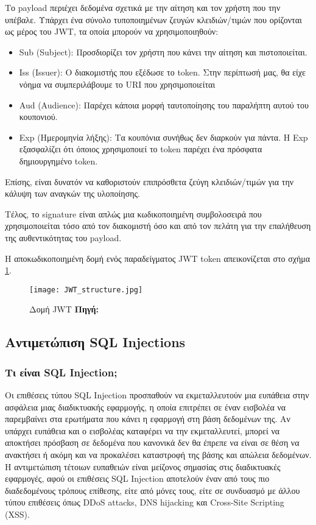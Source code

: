 Το payload περιέχει δεδομένα σχετικά με την αίτηση και τον χρήστη που την υπέβαλε. Υπάρχει ένα σύνολο τυποποιημένων ζευγών κλειδιών/τιμών που ορίζονται ως μέρος του JWT, τα οποία μπορούν να χρησιμοποιηθούν:
\begin{itemize}
  \item Sub (Subject): Προσδιορίζει τον χρήστη που κάνει την αίτηση και πιστοποιείται.
  \item Iss (Issuer): Ο διακομιστής που εξέδωσε το token. Στην περίπτωσή μας, θα είχε νόημα να συμπεριλάβουμε το URI που χρησιμοποιείται
  \item Aud (Audience): Παρέχει κάποια μορφή ταυτοποίησης του παραλήπτη αυτού του κουπονιού.
  \item Exp (Ημερομηνία λήξης): Τα κουπόνια συνήθως δεν διαρκούν για πάντα. Η Exp εξασφαλίζει ότι όποιος χρησιμοποιεί το token παρέχει ένα πρόσφατα δημιουργημένο token.
\end{itemize}
Επίσης, είναι δυνατόν να καθοριστούν επιπρόσθετα ζεύγη κλειδιών/τιμών για την κάλυψη των αναγκών της υλοποίησης.

Τέλος, το signature είναι απλώς μια κωδικοποιημένη συμβολοσειρά που χρησιμοποιείται τόσο από τον διακομιστή όσο και από τον πελάτη για την επαλήθευση της αυθεντικότητας του payload.

Η αποκωδικοποιημένη δομή ενός παραδείγματος JWT token απεικονίζεται στο σχήμα \ref{fig:JWT_structure}.

\begin{figure}[h]
	\centering
	\texttt{[image: JWT\_structure.jpg]}
	\caption[{Δομή JWT}]{Δομή JWT \textbf{Πηγή:} \cite{fig_JWT_structure}}
	\label{fig:JWT_structure}
\end{figure}

\subsection{Αντιμετώπιση SQL Injections}
\subsubsection{Τι είναι SQL Injection;}
Οι επιθέσεις τύπου SQL Injection προσπαθούν να εκμεταλλευτούν μια ευπάθεια στην ασφάλεια μιας διαδικτυακής εφαρμογής, η οποία επιτρέπει σε έναν εισβολέα να παρεμβαίνει στα ερωτήματα που κάνει η εφαρμογή στη βάση δεδομένων της. Αν υπάρχει ευπάθεια και ο εισβολέας καταφέρει να την εκμεταλλευτεί, μπορεί να αποκτήσει πρόσβαση σε δεδομένα που κανονικά δεν θα έπρεπε να είναι σε θέση να ανακτήσει ή ακόμη και να προκαλέσει καταστροφή της βάσης και απώλεια δεδομένων. Η αντιμετώπιση τέτοιων ευπαθειών είναι μείζονος σημασίας στις διαδικτυακές εφαρμογές, αφού οι επιθέσεις SQL Injection αποτελούν έναν από τους πιο διαδεδομένους τρόπους επίθεσης, είτε από μόνες τους, είτε σε συνδυασμό με άλλου τύπου επιθέσεις όπως DDoS attacks, DNS hijacking και Cross-Site Scripting (XSS).

